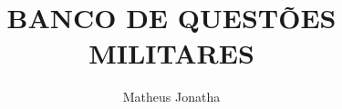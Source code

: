 \documentclass{scrartcl} %
\title{BANCO DE QUESTÕES MILITARES}
\author{Matheus Jonatha}
\begin{document}
\maketitle
\begin{multicols}{2}

% 
% 
% 
% 
% 
% 
% 
% 
% 
% 
% 
% 
% 
% 
% 
% 
% 
% 
% 

\end{multicols}
\end{document}
